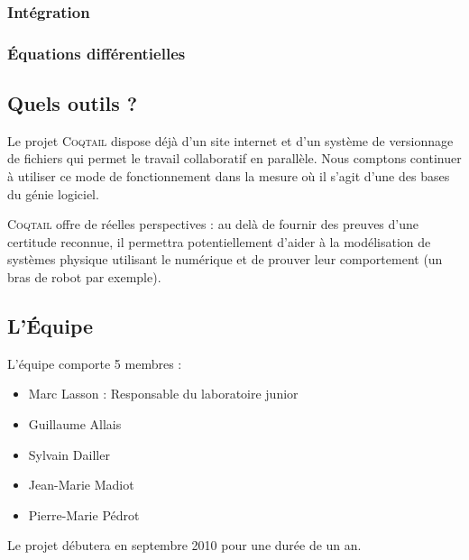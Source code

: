 \documentclass[11pt]{article}
\newcommand{\coqtail}{\textsc{Coqtail}}
\newcommand{\coquille}{\textsc{Coquille}}
\begin{document}
\subsubsection{Intégration}

\subsubsection{Équations différentielles}


\subsection{Quels outils ?}

Le projet \coqtail{} dispose déjà d'un site internet\cite{coqtail} et d'un système de versionnage de fichiers qui permet le travail collaboratif en parallèle. Nous comptons continuer à utiliser ce mode de fonctionnement dans la mesure où il s'agit d'une des bases du génie logiciel.




\coqtail{} offre de réelles perspectives : au delà de fournir des preuves d'une certitude reconnue, %
il permettra potentiellement d'aider à la modélisation de systèmes physique utilisant le numérique et de prouver leur comportement (un bras de robot par exemple). %

\subsection{L'Équipe}

L'équipe comporte 5 membres :

\begin{itemize}
 \item Marc Lasson : Responsable du laboratoire junior
 \item Guillaume Allais
 \item Sylvain Dailler
 \item Jean-Marie Madiot
 \item Pierre-Marie Pédrot
\end{itemize}

Le projet débutera en septembre 2010 pour une durée de un an.

\printbibliography
\end{document}
